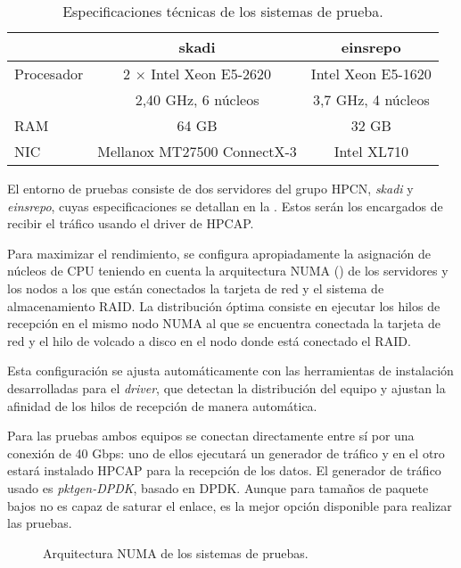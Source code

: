 \documentclass[twoside, 12pt]{epstfg}
\begin{document}
\begin{table}[hbtp]
\centering
\small
\begin{tabular}{lcc}
\toprule & \textbf{skadi} & \textbf{einsrepo} \\ \midrule
Procesador 	& 2 $\times$ Intel Xeon E5-2620 	& Intel Xeon E5-1620  	\\
			& 2,40 GHz, 6 núcleos 		& 3,7 GHz, 4 núcleos  		\\
RAM 		& 64 GB 		& 32 GB 			\\
NIC 		& Mellanox MT27500 ConnectX-3 & Intel XL710 \\ \bottomrule
\end{tabular}
\caption{Especificaciones técnicas de los sistemas de prueba.}
\label{tab:Validacion:Sistemas}
\end{table}

El entorno de pruebas consiste de dos servidores del grupo HPCN, \textit{skadi} y \textit{einsrepo}, cuyas especificaciones se detallan en la . Estos serán los encargados de recibir el tráfico usando el driver de HPCAP.

Para maximizar el rendimiento, se configura apropiadamente la asignación de núcleos de CPU teniendo en cuenta la arquitectura \gls{NUMA} () de los servidores y los nodos a los que están conectados la tarjeta de red y el sistema de almacenamiento RAID. La distribución óptima \cite{m3omon} consiste en ejecutar los hilos de recepción en el mismo nodo NUMA al que se encuentra conectada la tarjeta de red y el hilo de volcado a disco en el nodo donde está conectado el RAID.

Esta configuración se ajusta automáticamente con las herramientas de instalación desarrolladas para el \textit{driver}, que detectan la distribución del equipo y ajustan la afinidad de los hilos de recepción de manera automática.

Para las pruebas ambos equipos se conectan directamente entre sí por una conexión de 40 Gbps: uno de ellos ejecutará un generador de tráfico y en el otro estará instalado HPCAP para la recepción de los datos. El generador de tráfico usado es \textit{pktgen-DPDK}, basado en DPDK. Aunque para tamaños de paquete bajos no es capaz de saturar el enlace, es la mejor opción disponible para realizar las pruebas.

\begin{figure}[tbp]
\centering
\footnotesize

\caption{Arquitectura NUMA de los sistemas de pruebas.}
\label{fig:Validacion:NUMAArch}
\end{figure}
\end{document}
